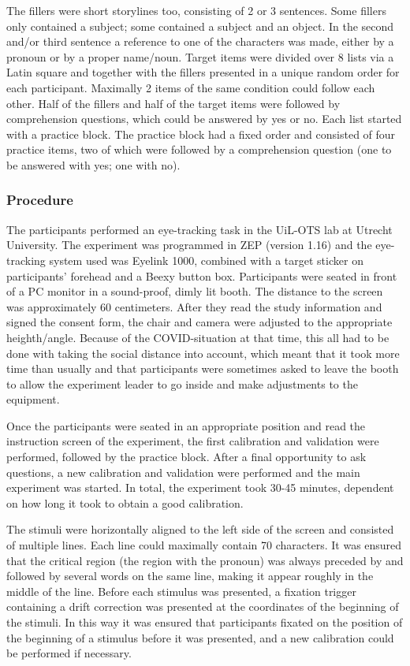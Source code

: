 \documentclass[11pt]{article} %
\begin{document}
The fillers were short storylines too, consisting of 2 or 3 sentences. Some fillers only contained a subject; some contained a subject and an object. In the second and/or third sentence a reference to one of the characters was made, either by a pronoun or by a proper name/noun.  Target items were divided over 8 lists via a Latin square and together with the fillers presented in a unique random order for each participant. Maximally 2 items of the same condition could follow each other. Half of the fillers and half of the target items were followed by comprehension questions, which could be answered by yes or no. Each list started with a practice block. The practice block had a fixed order and consisted of four practice items, two of which were followed by a comprehension question (one to be answered with yes; one with no). 

\subsubsection{Procedure}

The participants performed an eye-tracking task in the UiL-OTS lab at Utrecht University. The experiment was programmed in ZEP (version 1.16) and the eye-tracking system used was Eyelink 1000, combined with a target sticker on participants' forehead and a Beexy button box. Participants were seated in front of a PC monitor in a sound-proof, dimly lit booth. The distance to the screen was approximately 60 centimeters. After they read the study information and signed the consent form, the chair and camera were adjusted to the appropriate heighth/angle. Because of the COVID-situation at that time, this all had to be done with taking the social distance into account, which meant that it took more time than usually and that participants were sometimes asked to leave the booth to allow the experiment leader to go inside and make adjustments to the equipment. 

Once the participants were seated in an appropriate position and read the instruction screen of the experiment, the first calibration and validation were performed, followed by the practice block. After a final opportunity to ask questions, a new calibration and validation were performed and the main experiment was started. In total, the experiment took 30-45 minutes, dependent on how long it took to obtain a good calibration.

The stimuli were horizontally aligned to the left side of the screen and consisted of multiple lines. Each line could maximally contain 70 characters. It was ensured that the critical region (the region with the pronoun) was always preceded by and followed by several words on the same line, making it appear roughly in the middle of the line. Before each stimulus was presented, a fixation trigger containing a drift correction was presented at the coordinates of the beginning of the stimuli. In this way it was ensured that participants fixated on the position of the beginning of a stimulus before it was presented, and a new calibration could be performed if necessary. 
\end{document}
